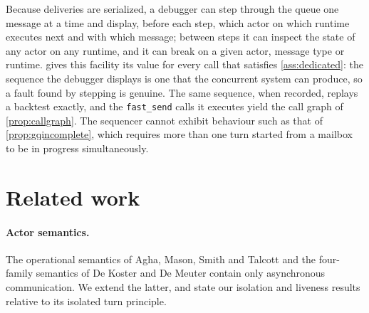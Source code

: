 \documentclass[11pt]{article}
\theoremstyle{definition}
\theoremstyle{remark}
\newcommand{\fs}{\texttt{fast\_send}}
\begin{document}
Because deliveries are serialized, a debugger can step through the queue one message at a
time and display, before each step, which actor on which runtime executes next and with
which message; between steps it can inspect the state of any actor on any runtime, and it
can break on a given actor, message type or runtime.  gives this
facility its value for every call that satisfies \cref{ass:dedicated}: the sequence the
debugger displays is one that the concurrent system can produce, so a fault found by
stepping is genuine. The same sequence, when recorded, replays a backtest exactly, and the
\fs{} calls it executes yield the call graph of \cref{prop:callgraph}. The sequencer
cannot exhibit behaviour such as that of \cref{prop:gqincomplete}, which requires more
than one turn started from a mailbox to be in progress simultaneously.

\section{Related work}
\label{sec:related}

\paragraph{Actor semantics.} The operational semantics of Agha, Mason, Smith and Talcott
\cite{agha1997} and the four-family semantics of De Koster and De Meuter
\cite{dekoster2024} contain only asynchronous communication. We extend the latter, and
state our isolation and liveness results relative to its isolated turn principle.
\end{document}
